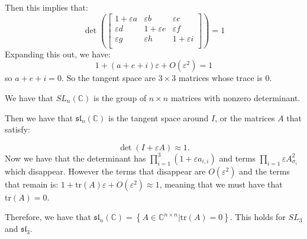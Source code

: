 \documentclass[]{article}
\newcommand{\tr}{\text{tr}}
\begin{document}
Then this implies that:
\begin{equation}
	\det
	\left(
	\begin{bmatrix}
		1 + \varepsilon a & \varepsilon b & \varepsilon c \\
		\varepsilon d & 1 + \varepsilon e & \varepsilon f \\
		\varepsilon g & \varepsilon h     & 1 + \varepsilon i\\
	\end{bmatrix}
	\right)
	= 1
\end{equation}
Expanding this out, we have:
\begin{equation}
	1 + (a + e + i)\varepsilon + O(\varepsilon^2) = 1
\end{equation}
so $a + e + i = 0$. So the tangent space are $3 \times 3$ matrices whose trace is 0.

We have that $SL_n(\mathbb{C})$ is the group of $n \times n$ matrices with nonzero determinant. 

Then we have that $\mathfrak{sl}_n(\mathbb{C})$ is the tangent space around $I$, or the matrices $A$ that satisfy:

\begin{equation}
	\det \left(I + \varepsilon A\right) \approx 1.
\end{equation}
Now we have that the determinant has $\prod_{i = 1}^3 ( 1 + \varepsilon a_{i,i})$ and terms $\prod_{i = 1} \varepsilon A_{\sigma_i}^2$ which disappear. However the terms that disappear are $O(\varepsilon^2)$ and the terms that remain is: $1 + \tr(A) \varepsilon + O(\varepsilon^2) \approx 1$, meaning that we must have that $\tr(A) = 0$. 

Therefore, we have that $\mathfrak{sl}_n(\mathbb{C}) = \left\{A \in \mathbb{C}^{n \times n} | \tr(A) = 0\right\}$.
This holds for $SL_3$ and $\mathfrak{sl}_3$. 
\end{document}
